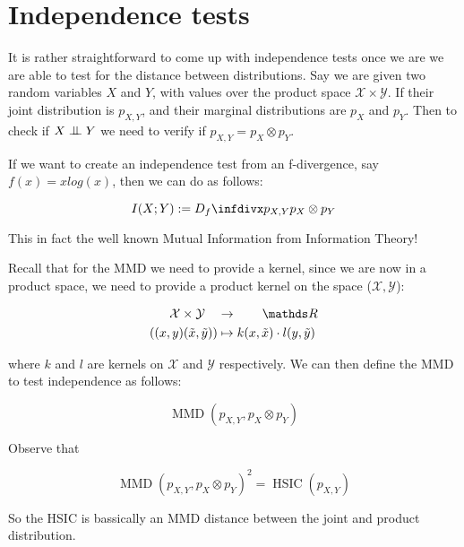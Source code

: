 \section{Independence tests}

It is rather straightforward to come up with independence tests once we are we are able to test 
for the distance between distributions. Say we are given two random variables $X$ and $Y$, with 
values over the product space $\mathcal{X} \times \mathcal{Y}$. If their joint distribution is 
$p_{X, Y}$, and their marginal distributions are $p_X$ and $p_Y$. Then to check if $X \bigCI Y$
we need to verify if $p_{X, Y} = p_X \otimes p_Y$.

If we want to create an independence test from an f-divergence, say $f(x) = xlog(x)$, then we 
can do as follows:

$$
    I (X; Y) :=  \infdiv{p_{X, Y}}{p_X \otimes p_Y}
$$

This in fact the well known Mutual Information from Information Theory! 

Recall that for the MMD we need to provide a kernel, since we are now in a product space, we need 
to provide a product kernel on the space ($\mathcal{X}, \mathcal{Y}$):

\begin{align*}
    \mathcal{X} \times \mathcal{Y} \quad &\rightarrow \qquad \R \\
    ( (x, y) (\tilde{x}, \tilde{y})) &\mapsto k(x, \tilde{x}) \cdot l(y, \tilde{y})
\end{align*}

where $k$ and $l$ are kernels on $\mathcal{X}$ and $\mathcal{Y}$ respectively. We can then define the 
MMD to test independence as follows:

$$
    \operatorname{MMD}\left( p_{X, Y}, p_X \otimes p_Y  \right)
$$

Observe that 

$$
    \operatorname{MMD}\left( p_{X, Y}, p_X \otimes p_Y  \right)^2 = \operatorname{HSIC}(p_{X, Y})
$$

So the HSIC is bassically an MMD distance between the joint and product distribution. 






